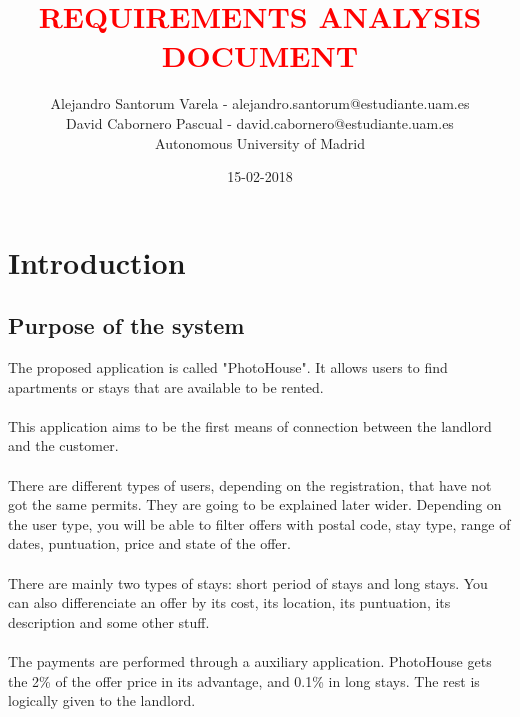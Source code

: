 \documentclass[12pt]{article}
\begin{document}
	\date{15-02-2018}
	
	
	\title{\textbf{\textcolor{red}{REQUIREMENTS ANALYSIS DOCUMENT}}}
	\author{Alejandro Santorum Varela - alejandro.santorum@estudiante.uam.es\\David Cabornero Pascual - david.cabornero@estudiante.uam.es\\Autonomous University of Madrid}
	\maketitle
	
\tableofcontents

\section{Introduction}
\subsection{Purpose of the system}
The proposed application is called "PhotoHouse". It allows users to find apartments or stays that are available to be rented.\\\\
This application aims to be the first means of connection between the landlord and the customer.\\\\
There are different types of users, depending on the registration, that have not got the same permits. They are going to be explained  later wider. Depending on the user type, you will be able to filter offers with postal code, stay type, range of dates, puntuation, price and state of the offer.\\\\
There are mainly two types of stays: short period of stays and long stays. You can also differenciate an offer by its cost, its location, its puntuation, its description and some other stuff.\\\\
The payments are performed through a auxiliary application. PhotoHouse gets the 2\% of the offer price in its advantage, and 0.1\% in long stays. The rest is logically given to the landlord.\\\\
\end{document}
